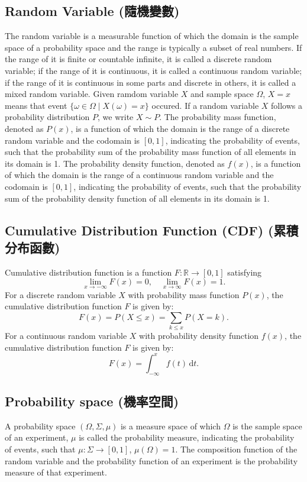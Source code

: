 \documentclass[a4paper,12pt]{report}
\begin{document}
\subsection{Random Variable (隨機變數)}
The random variable is a measurable function of which the domain is the sample space of a probability space and the range is typically a subset of real numbers. If the range of it is finite or countable infinite, it is called a discrete random variable; if the range of it is continuous, it is called a continuous random variable; if the range of it is continuous in some parts and discrete in others, it is called a mixed random variable. Given ramdom variable $X$ and sample space $\Omega$, $X=x$ means that event $\{\omega \in \Omega \mid X(\omega) = x\}$ occured. If a random variable $X$ follows a probability distribution $P$, we write $X\sim P$.
The probability mass function, denoted as $P(x)$, is a function of which the domain is the range of a discrete random variable and the codomain is $[0,1]$, indicating the probability of events, such that the probability sum of the probability mass function of all elements in its domain is 1.
The probability density function, denoted as $f(x)$, is a function of which the domain is the range of a continuous random variable and the codomain is $[0,1]$, indicating the probability of events, such that the probability sum of the probability density function of all elements in its domain is 1.
\subsection{Cumulative Distribution Function (CDF) (累積分布函數)}
Cumulative distribution function is a function $F\colon\mathbb{R}\to[0,1]$ satisfying
\[\lim_{x\to-\infty}F(x)=0,\quad\lim_{x\to\infty}F(x)=1.\]
For a discrete random variable \( X \) with probability mass function \( P(x) \), the cumulative distribution function $F$ is given by:
\[F(x) = P(X\leq x) = \sum_{k \leq x} P(X = k).\]
For a continuous random variable \( X \) with probability density function \( f(x) \), the cumulative distribution function $F$ is given by:
\[ F(x) = \int_{-\infty}^xf(t)\,\mathrm{d}t.\]
\subsection{Probability space (機率空間)}
A probability space $(\Omega,\Sigma,\mu)$ is a measure space of which $\Omega$ is the sample space of an experiment, $\mu$ is called the probability measure, indicating the probability of events, such that $\mu\colon\Sigma\to [0,1]$, $\mu(\Omega)=1$. The composition function of the random variable and the probability function of an experiment is the probability measure of that experiment.
\end{document}
